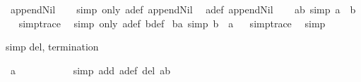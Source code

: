 \begin{isabellebody}
\ append{\isacharunderscore}{\kern0pt}Nil{}\isanewline
%
\isadelimproof
\ \ %
\endisadelimproof
%
\isatagproof
{}\isamarkupfalse%
\ {\isacharparenleft}{\kern0pt}simp\ only{\isacharcolon}{\kern0pt}\ a{\isacharunderscore}{\kern0pt}def\ append{\isacharunderscore}{\kern0pt}Nil{}{\isacharparenright}{\kern0pt}\ \isamarkupfalse%
\ a{\isacharunderscore}{\kern0pt}def\ append{\isacharunderscore}{\kern0pt}Nil{}\isanewline
\ \ \isamarkupfalse%
%
\endisatagproof
{\isafoldproof}%
%
\isadelimproof
\isanewline
%
\endisadelimproof
\isanewline
{}\isamarkupfalse%
\ ab\ {\isacharbrackleft}{\kern0pt}simp{\isacharbrackright}{\kern0pt}{\isacharcolon}{\kern0pt}\ {\isachardoublequoteopen}a\ {\isacharequal}{\kern0pt}\ b{\isachardoublequoteclose}%
\isadelimproof
\ %
\endisadelimproof
%
\isatagproof
{}\isamarkupfalse%
\ {\isacharbrackleft}{\kern0pt}{\isacharbrackleft}{\kern0pt}simp{\isacharunderscore}{\kern0pt}trace{\isacharbrackright}{\kern0pt}{\isacharbrackright}{\kern0pt}\ \isamarkupfalse%
\ {\isacharparenleft}{\kern0pt}simp\ only{\isacharcolon}{\kern0pt}\ a{\isacharunderscore}{\kern0pt}def\ b{\isacharunderscore}{\kern0pt}def{\isacharparenright}{\kern0pt}%
\endisatagproof
{\isafoldproof}%
%
\isadelimproof
%
\endisadelimproof
\isanewline
{}\isamarkupfalse%
\ ba\ {\isacharbrackleft}{\kern0pt}simp{\isacharbrackright}{\kern0pt}{\isacharcolon}{\kern0pt}\ {\isachardoublequoteopen}b\ {\isacharequal}{\kern0pt}\ a{\isachardoublequoteclose}%
\isadelimproof
\ %
\endisadelimproof
%
\isatagproof
{}\isamarkupfalse%
\ {\isacharbrackleft}{\kern0pt}{\isacharbrackleft}{\kern0pt}simp{\isacharunderscore}{\kern0pt}trace{\isacharbrackright}{\kern0pt}{\isacharbrackright}{\kern0pt}\ \isamarkupfalse%
\ simp%
\endisatagproof
{\isafoldproof}%
%
\isadelimproof
%
\endisadelimproof
%
\begin{isamarkuptext}%
simp del, termination%
\end{isamarkuptext}\isamarkuptrue%
\isamarkupfalse%
\ {\isachardoublequoteopen}a\ {\isacharequal}{\kern0pt}\ {\isacharbrackleft}{\kern0pt}{\isacharbrackright}{\kern0pt}{\isachardoublequoteclose}\isanewline
\ \ \isanewline
\ \ \isanewline
%
\isadelimproof
\ \ %
\endisadelimproof
%
\isatagproof
{}\isamarkupfalse%
\ {\isacharparenleft}{\kern0pt}simp\ add{\isacharcolon}{\kern0pt}\ a{\isacharunderscore}{\kern0pt}def\ del{\isacharcolon}{\kern0pt}\ ab{\isacharparenright}{\kern0pt}\isanewline
\ \ \isamarkupfalse%

\end{isabellebody}
